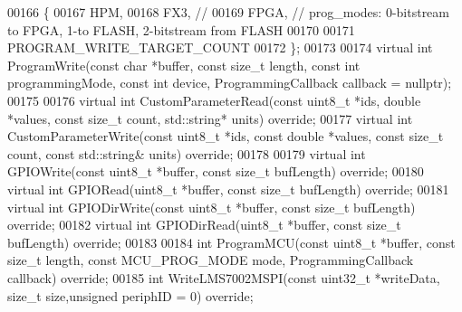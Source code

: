 \begin{DoxyCode}
00166     \{
00167         HPM,
00168         FX3, \textcolor{comment}{//}
00169         FPGA, \textcolor{comment}{// prog\_modes: 0-bitstream to FPGA, 1-to FLASH, 2-bitstream from FLASH}
00170 
00171         PROGRAM\_WRITE\_TARGET\_COUNT
00172     \};
00173 
00174     \textcolor{keyword}{virtual} \textcolor{keywordtype}{int} ProgramWrite(\textcolor{keyword}{const} \textcolor{keywordtype}{char} *buffer, \textcolor{keyword}{const} \textcolor{keywordtype}{size\_t} length, \textcolor{keyword}{const} \textcolor{keywordtype}{int} programmingMode, \textcolor{keyword}{const} \textcolor{keywordtype}{int} 
      device, ProgrammingCallback callback = \textcolor{keyword}{nullptr});
00175 
00176     \textcolor{keyword}{virtual} \textcolor{keywordtype}{int} CustomParameterRead(\textcolor{keyword}{const} uint8\_t *ids, \textcolor{keywordtype}{double} *values, \textcolor{keyword}{const} \textcolor{keywordtype}{size\_t} 
      count, std::string* units) \textcolor{keyword}{override};
00177     \textcolor{keyword}{virtual} \textcolor{keywordtype}{int} CustomParameterWrite(\textcolor{keyword}{const} uint8\_t *ids, \textcolor{keyword}{const} \textcolor{keywordtype}{double} *values, \textcolor{keyword}{const} \textcolor{keywordtype}{size\_t} 
      count, \textcolor{keyword}{const} std::string& units) \textcolor{keyword}{override};
00178 
00179     \textcolor{keyword}{virtual} \textcolor{keywordtype}{int} GPIOWrite(\textcolor{keyword}{const} uint8\_t *buffer, \textcolor{keyword}{const} \textcolor{keywordtype}{size\_t} bufLength) \textcolor{keyword}{override};
00180     \textcolor{keyword}{virtual} \textcolor{keywordtype}{int} GPIORead(uint8\_t *buffer, \textcolor{keyword}{const} \textcolor{keywordtype}{size\_t} bufLength) \textcolor{keyword}{override};
00181     \textcolor{keyword}{virtual} \textcolor{keywordtype}{int} GPIODirWrite(\textcolor{keyword}{const} uint8\_t *buffer, \textcolor{keyword}{const} \textcolor{keywordtype}{size\_t} bufLength) \textcolor{keyword}{override};
00182     \textcolor{keyword}{virtual} \textcolor{keywordtype}{int} GPIODirRead(uint8\_t *buffer, \textcolor{keyword}{const} \textcolor{keywordtype}{size\_t} bufLength) \textcolor{keyword}{override};
00183 
00184     \textcolor{keywordtype}{int} ProgramMCU(\textcolor{keyword}{const} uint8\_t *buffer, \textcolor{keyword}{const} \textcolor{keywordtype}{size\_t} length, \textcolor{keyword}{const} 
      MCU_PROG_MODE mode, ProgrammingCallback callback) \textcolor{keyword}{override};
00185     \textcolor{keywordtype}{int} WriteLMS7002MSPI(\textcolor{keyword}{const} uint32\_t *writeData, \textcolor{keywordtype}{size\_t} size,\textcolor{keywordtype}{unsigned} periphID = 0) \textcolor{keyword}{override};

\end{DoxyCode}
